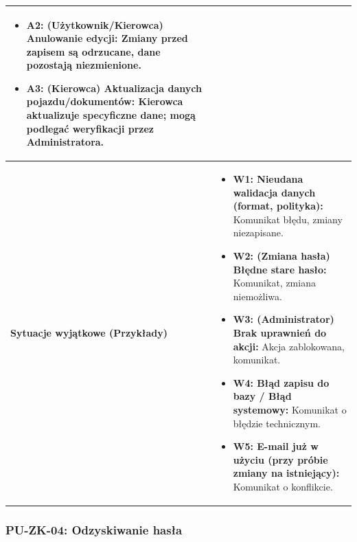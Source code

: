 \documentclass[a4paper,12pt]{article}
\begin{document}
\begin{longtable}{|p{\pierwszakolumnaszerokoscPUZKDaneShort}|p{\drugakolumnaszerokoscPUZKDaneShort}|}
\begin{itemize}
            \item \textbf{A2: (Użytkownik/Kierowca) Anulowanie edycji:} Zmiany przed zapisem są odrzucane, dane pozostają niezmienione.
            \item \textbf{A3: (Kierowca) Aktualizacja danych pojazdu/dokumentów:} Kierowca aktualizuje specyficzne dane; mogą podlegać weryfikacji przez Administratora.
        \end{itemize} \\
    \hline
    \textbf{Sytuacje wyjątkowe (Przykłady)} & 
        \begin{itemize} \itemsep0pt \parskip0pt \parsep0pt
            \item \textbf{W1: Nieudana walidacja danych (format, polityka):} Komunikat błędu, zmiany niezapisane.
            \item \textbf{W2: (Zmiana hasła) Błędne stare hasło:} Komunikat, zmiana niemożliwa.
            \item \textbf{W3: (Administrator) Brak uprawnień do akcji:} Akcja zablokowana, komunikat.
            \item \textbf{W4: Błąd zapisu do bazy / Błąd systemowy:} Komunikat o błędzie technicznym.
            \item \textbf{W5: E-mail już w użyciu (przy próbie zmiany na istniejący):} Komunikat o konflikcie.
        \end{itemize} \\
\end{longtable}
\endgroup



\subsubsection{PU-ZK-04: Odzyskiwanie hasła}

\begingroup %
\small %
\renewcommand{\arraystretch}{1.3} %

\newlength{\pierwszakolumnaszerokoscPUZKOdzysk} 
\setlength{\pierwszakolumnaszerokoscPUZKOdzysk}{4.2cm} %

\newlength{\drugakolumnaszerokoscPUZKOdzysk} 
\setlength{\drugakolumnaszerokoscPUZKOdzysk}{\dimexpr\textwidth-\pierwszakolumnaszerokoscPUZKOdzysk-2\tabcolsep-3\arrayrulewidth\relax}
\end{document}
